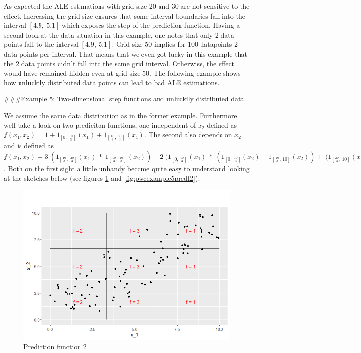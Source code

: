 \documentclass[
]{krantz}
\begin{document}
As expected the ALE estimations with grid size 20 and 30 are not sensitive to the effect. Increasing the grid size ensures that some interval boundaries fall into the interval \([4.9, ~5.1]\) which exposes the step of the prediction function.
Having a second look at the data situation in this example, one notes that only 2 data points fall to the interval \([4.9, ~5.1]\). Grid size 50 implies for 100 datapoints 2 data points per interval. That means that we even got lucky in this example that the 2 data points didn't fall into the same grid interval. Otherwise, the effect would have remained hidden even at grid size 50. The following example shows how unluckily distributed data points can lead to bad ALE estimations.

\#\#\#Example 5: Two-dimensional step functions and unluckily distributed data

We assume the same data distribution as in the former example. Furthermore well take a look on two prediciton functions, one independent of \(x_2\) defined as \(f(x_1, x_2) = 1 + 1_{[0,~\frac{10}{3}]}(x_1)+ 1_{[\frac{10}{3},~\frac{20}{3}]}(x_1)\). The second also depends on \(x_2\) and is defined as
\(f(x_1, x_2) = 3~(1_{[\frac{10}{3},~\frac{20}{3}]}(x_1)~*~1_{[\frac{10}{3},~\frac{20}{3}]}(x_2)) + 2~(1_{[0,~\frac{10}{3}]}(x_1)~*~(1_{[0,~\frac{10}{3}]}(x_2)+1_{[\frac{20}{3}, ~10]}(x_2)) + ~(1_{[\frac{20}{3},~10]}(x_1)~*~(1_{[0,~\frac{10}{3}]}(x_2)+1_{[\frac{20}{3}, ~10]}(x_2))\) .
Both on the first sight a little unhandy become quite easy to understand looking at the sketches below (see figures \ref{fig:pwcexample5predf1} and \ref{fig:pwcexample5predf2}).

\begin{figure}
\includegraphics[width=1\linewidth]{images/ALE_2_pwc_example5_predf_1_} \caption{Prediction function 2}\label{fig:pwcexample5predf1}
\end{figure}
\end{document}
